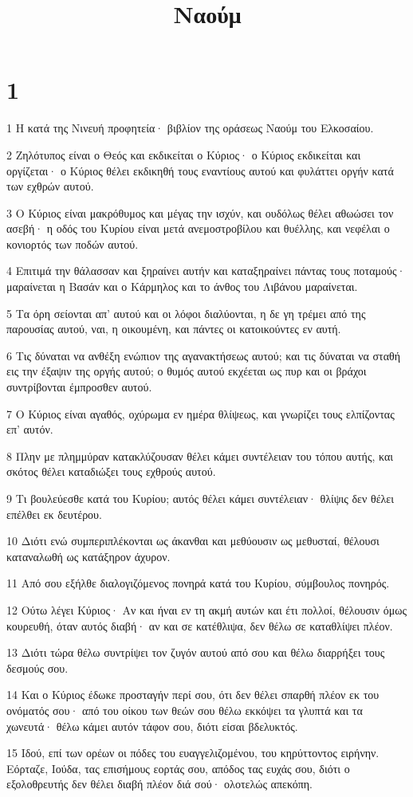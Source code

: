 

\title{Ναούμ}


\chapter{1}

\par 1 Η κατά της Νινευή προφητεία· βιβλίον της οράσεως Ναούμ του Ελκοσαίου.
\par 2 Ζηλότυπος είναι ο Θεός και εκδικείται ο Κύριος· ο Κύριος εκδικείται και οργίζεται· ο Κύριος θέλει εκδικηθή τους εναντίους αυτού και φυλάττει οργήν κατά των εχθρών αυτού.
\par 3 Ο Κύριος είναι μακρόθυμος και μέγας την ισχύν, και ουδόλως θέλει αθωώσει τον ασεβή· η οδός του Κυρίου είναι μετά ανεμοστροβίλου και θυέλλης, και νεφέλαι ο κονιορτός των ποδών αυτού.
\par 4 Επιτιμά την θάλασσαν και ξηραίνει αυτήν και καταξηραίνει πάντας τους ποταμούς· μαραίνεται η Βασάν και ο Κάρμηλος και το άνθος του Λιβάνου μαραίνεται.
\par 5 Τα όρη σείονται απ' αυτού και οι λόφοι διαλύονται, η δε γη τρέμει από της παρουσίας αυτού, ναι, η οικουμένη, και πάντες οι κατοικούντες εν αυτή.
\par 6 Τις δύναται να ανθέξη ενώπιον της αγανακτήσεως αυτού; και τις δύναται να σταθή εις την έξαψιν της οργής αυτού; ο θυμός αυτού εκχέεται ως πυρ και οι βράχοι συντρίβονται έμπροσθεν αυτού.
\par 7 Ο Κύριος είναι αγαθός, οχύρωμα εν ημέρα θλίψεως, και γνωρίζει τους ελπίζοντας επ' αυτόν.
\par 8 Πλην με πλημμύραν κατακλύζουσαν θέλει κάμει συντέλειαν του τόπου αυτής, και σκότος θέλει καταδιώξει τους εχθρούς αυτού.
\par 9 Τι βουλεύεσθε κατά του Κυρίου; αυτός θέλει κάμει συντέλειαν· θλίψις δεν θέλει επέλθει εκ δευτέρου.
\par 10 Διότι ενώ συμπεριπλέκονται ως άκανθαι και μεθύουσιν ως μεθυσταί, θέλουσι καταναλωθή ως κατάξηρον άχυρον.
\par 11 Από σου εξήλθε διαλογιζόμενος πονηρά κατά του Κυρίου, σύμβουλος πονηρός.
\par 12 Ούτω λέγει Κύριος· Αν και ήναι εν τη ακμή αυτών και έτι πολλοί, θέλουσιν όμως κουρευθή, όταν αυτός διαβή· αν και σε κατέθλιψα, δεν θέλω σε καταθλίψει πλέον.
\par 13 Διότι τώρα θέλω συντρίψει τον ζυγόν αυτού από σου και θέλω διαρρήξει τους δεσμούς σου.
\par 14 Και ο Κύριος έδωκε προσταγήν περί σου, ότι δεν θέλει σπαρθή πλέον εκ του ονόματός σου· από του οίκου των θεών σου θέλω εκκόψει τα γλυπτά και τα χωνευτά· θέλω κάμει αυτόν τάφον σου, διότι είσαι βδελυκτός.
\par 15 Ιδού, επί των ορέων οι πόδες του ευαγγελιζομένου, του κηρύττοντος ειρήνην. Εόρταζε, Ιούδα, τας επισήμους εορτάς σου, απόδος τας ευχάς σου, διότι ο εξολοθρευτής δεν θέλει διαβή πλέον διά σού· ολοτελώς απεκόπη.

